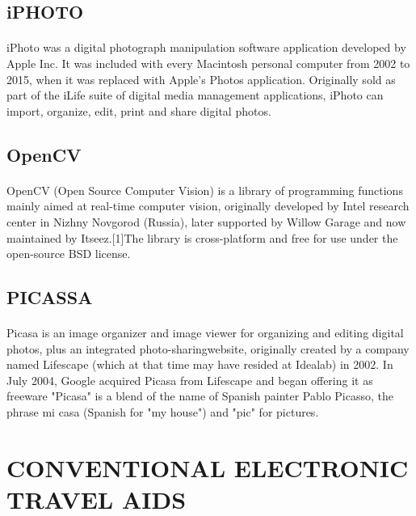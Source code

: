 \documentclass[10pt,a4paper,twoside]{report}
\begin{document}
\subsection{iPHOTO}
\paragraph{ }iPhoto was a digital photograph manipulation software application developed by Apple Inc. It was included with every Macintosh personal computer from 2002 to 2015, when it was replaced with Apple's Photos application. Originally sold as part of the iLife suite of digital media management applications, iPhoto can import, organize, edit, print and share digital photos.
\subsection{OpenCV}
\paragraph{ }OpenCV (Open Source Computer Vision) is a library of programming functions mainly aimed at real-time computer vision, originally developed by Intel research center in Nizhny Novgorod (Russia), later supported by Willow Garage and now maintained by Itseez.[1]The library is cross-platform and free for use under the open-source BSD license.
\subsection{PICASSA}
\paragraph{ }Picasa is an image organizer and image viewer for organizing and editing digital photos, plus an integrated photo-sharingwebsite, originally created by a company named Lifescape (which at that time may have resided at Idealab) in 2002. In July 2004, Google acquired Picasa from Lifescape and began offering it as freeware "Picasa" is a blend of the name of Spanish painter Pablo Picasso, the phrase mi casa (Spanish for "my house") and "pic" for pictures.

\section{CONVENTIONAL ELECTRONIC
TRAVEL AIDS}
\end{document}
